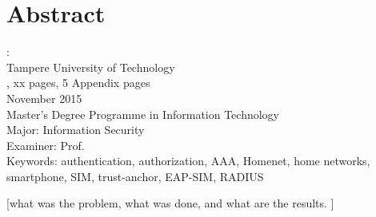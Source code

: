 \documentclass[12pt,a4paper,english]{tutthesis}
\begin{document}
\if@twoside
\clearpage
\fi


\setcounter{page}{0} %

\chapter*{Abstract}

\begin{spacing}{1.0}
  {\bf \textsf{\MakeUppercase{\@author}}}: \@title\\   %
   \textsf{Tampere University of Technology}\\
   \textsf{\@thesistype, xx pages, 5 Appendix pages} \\
   \textsf{November 2015}\\
   \textsf{Master's Degree Programme in Information Technology}\\
   \textsf{Major: Information Security}\\
   \textsf{Examiner: Prof. \@examiner}\\ %
   \textsf{Keywords: authentication, authorization, AAA, Homenet, home networks, smartphone, SIM, trust-anchor, EAP-SIM, RADIUS}\\
\end{spacing}

[what was the problem, what was done, and what are the results. ]
\end{document}
